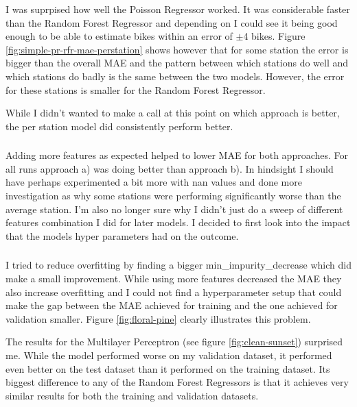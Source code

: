 \documentclass[a4paper]{article}
\begin{document}
    I was suprpised how well the Poisson Regressor worked. It was considerable faster than the Random Forest Regressor
    and depending on I could see it being good enough to be able to estimate bikes within an error of $\pm$4 bikes.
    Figure \ref{fig:simple-pr-rfr-mae-perstation} shows however that for some station the error is bigger
    than the overall MAE and the pattern between which stations do well and which stations do badly is the same between the
    two models. However, the error for these stations is smaller for the Random Forest Regressor.

    While I didn't wanted to make a call at this point on which approach is better, the per station model did consistently
    perform better.

    \subsubsection*{}
    Adding more features as expected helped to lower MAE for both approaches. For all runs approach a) was
    doing better than approach b). In hindsight I should have perhaps experimented a bit more with nan values and
    done more investigation as why some stations were performing significantly worse than the average station. I'm also
    no longer sure why I didn't just do a sweep of different features combination I did for later models.
    I decided to first look into the impact that the models hyper parameters had on the outcome.

    \subsubsection*{}

    I tried to reduce overfitting by finding a bigger min\_impurity\_decrease which did make
    a small improvement. While using more features decreased the MAE they also increase overfitting and I
    could not find a hyperparameter setup that could make the gap between the MAE achieved for training and the one achieved
    for validation smaller. Figure \ref{fig:floral-pine} clearly illustrates this problem.

    The results for the Multilayer Perceptron (see figure \ref{fig:clean-sunset}) surprised me. While the model performed
    worse on my validation dataset, it performed even better on the test dataset than it performed on the training dataset.
    Its biggest difference to any of the Random Forest Regressors is that it achieves very similar results for both the
    training and validation datasets.

    
    
\end{document}
